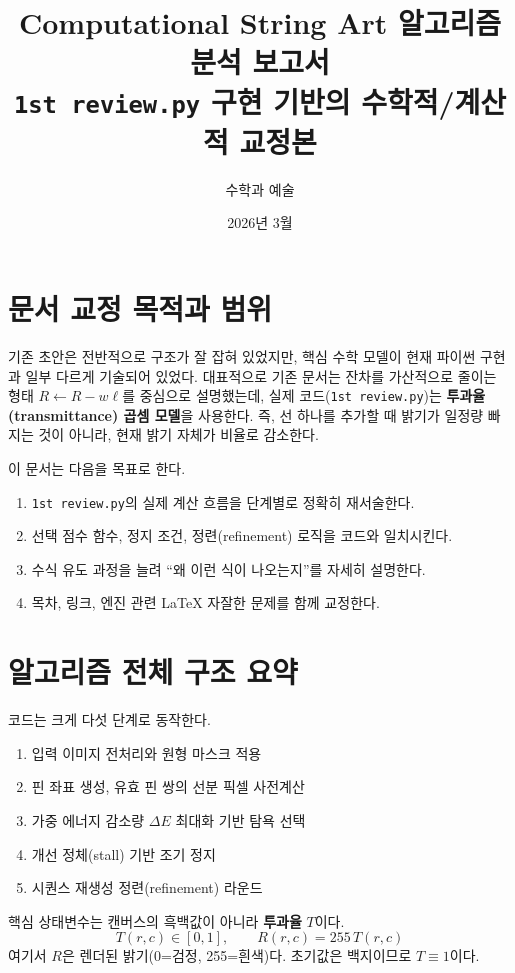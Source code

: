 \documentclass[11pt,a4paper]{article}
\title{\textbf{Computational String Art 알고리즘 분석 보고서}\\[4pt]
\large \texttt{1st review.py} 구현 기반의 수학적/계산적 교정본}
\author{수학과 예술}
\date{2026년 3월}
\begin{document}
\maketitle
\tableofcontents
\clearpage

\section{문서 교정 목적과 범위}
기존 초안은 전반적으로 구조가 잘 잡혀 있었지만, 핵심 수학 모델이 현재 파이썬 구현과 일부 다르게 기술되어 있었다.
대표적으로 기존 문서는 잔차를 가산적으로 줄이는 형태
\(R \leftarrow R - w\ell\)를 중심으로 설명했는데,
실제 코드(\texttt{1st review.py})는 \textbf{투과율(transmittance) 곱셈 모델}을 사용한다.
즉, 선 하나를 추가할 때 밝기가 일정량 빠지는 것이 아니라,
현재 밝기 자체가 비율로 감소한다.

이 문서는 다음을 목표로 한다.
\begin{enumerate}
  \item \texttt{1st review.py}의 실제 계산 흐름을 단계별로 정확히 재서술한다.
  \item 선택 점수 함수, 정지 조건, 정련(refinement) 로직을 코드와 일치시킨다.
  \item 수식 유도 과정을 늘려 ``왜 이런 식이 나오는지''를 자세히 설명한다.
  \item 목차, 링크, 엔진 관련 LaTeX 자잘한 문제를 함께 교정한다.
\end{enumerate}

\section{알고리즘 전체 구조 요약}
코드는 크게 다섯 단계로 동작한다.
\begin{enumerate}
  \item 입력 이미지 전처리와 원형 마스크 적용
  \item 핀 좌표 생성, 유효 핀 쌍의 선분 픽셀 사전계산
  \item 가중 에너지 감소량 \(\Delta E\) 최대화 기반 탐욕 선택
  \item 개선 정체(stall) 기반 조기 정지
  \item 시퀀스 재생성 정련(refinement) 라운드
\end{enumerate}

핵심 상태변수는 캔버스의 흑백값이 아니라 \textbf{투과율} \(T\)이다.
\begin{equation}
T(r,c) \in [0,1], \qquad R(r,c)=255\,T(r,c)
\end{equation}
여기서 \(R\)은 렌더된 밝기(0=검정, 255=흰색)다.
초기값은 백지이므로 \(T\equiv 1\)이다.
\end{document}

